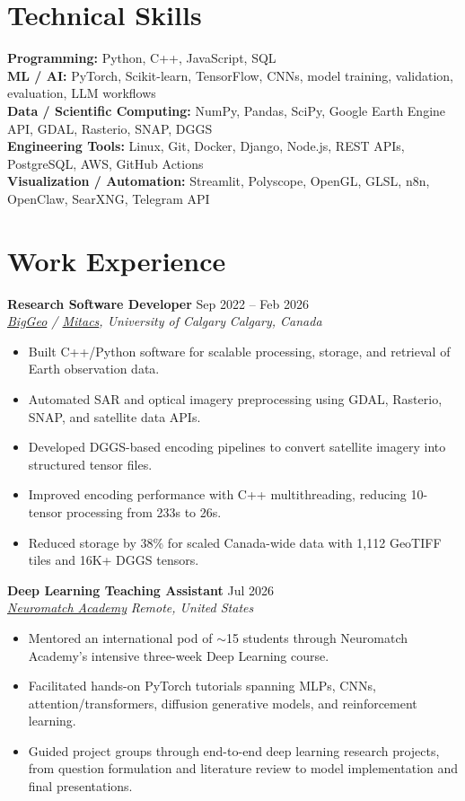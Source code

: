 \documentclass[a4paper,10pt]{article}
\newcommand{\resumeSubheading}[4]{
    \textbf{#1} \hfill #2 \\
    \textit{#3} \hfill \textit{#4}
}
\begin{document}
\section*{Technical Skills}

\textbf{Programming:} Python, C++, JavaScript, SQL \\
\textbf{ML / AI:} PyTorch, Scikit-learn, TensorFlow, CNNs, model training, validation, evaluation, LLM workflows \\
\textbf{Data / Scientific Computing:} NumPy, Pandas, SciPy, Google Earth Engine API, GDAL, Rasterio, SNAP, DGGS \\
\textbf{Engineering Tools:} Linux, Git, Docker, Django, Node.js, REST APIs, PostgreSQL, AWS, GitHub Actions \\
\textbf{Visualization / Automation:} Streamlit, Polyscope, OpenGL, GLSL, n8n, OpenClaw, SearXNG, Telegram API


\section*{Work Experience}

\resumeSubheading
{Research Software Developer}
{Sep 2022 -- Feb 2026}
{\href{https://biggeo.com}{BigGeo} / \href{https://www.mitacs.ca/}{Mitacs}, University of Calgary}
{Calgary, Canada}
\begin{itemize}[leftmargin=0.25in]
    \item Built C++/Python software for scalable processing, storage, and retrieval of Earth observation data.
    \item Automated SAR and optical imagery preprocessing using GDAL, Rasterio, SNAP, and satellite data APIs.
    \item Developed DGGS-based encoding pipelines to convert satellite imagery into structured tensor files.
    \item Improved encoding performance with C++ multithreading, reducing 10-tensor processing from 233s to 26s.
    \item Reduced storage by 38\% for scaled Canada-wide data with 1,112 GeoTIFF tiles and 16K+ DGGS tensors.
\end{itemize}

\resumeSubheading
{Deep Learning Teaching Assistant}
{Jul 2026}
{\href{https://neuromatch.io/}{Neuromatch Academy}}
{Remote, United States}
\begin{itemize}[leftmargin=0.25in]
    \item Mentored an international pod of $\sim$15 students through Neuromatch Academy's intensive three-week Deep Learning course.
    \item Facilitated hands-on PyTorch tutorials spanning MLPs, CNNs, attention/transformers, diffusion generative models, and reinforcement learning.
    \item Guided project groups through end-to-end deep learning research projects, from question formulation and literature review to model implementation and final presentations.
\end{itemize}
\end{document}
